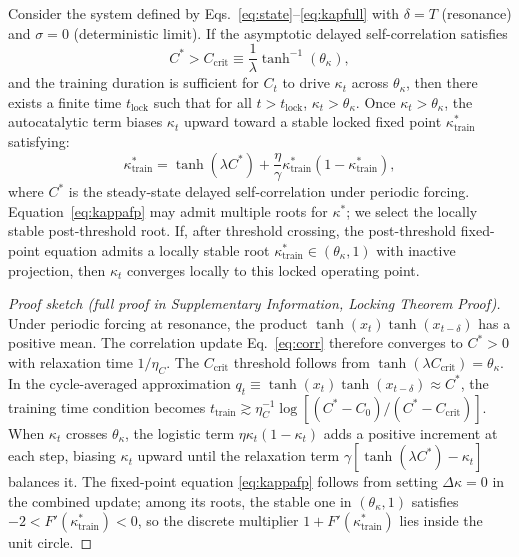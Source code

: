 \begin{theorem}[Locking]\label{thm:locking}
Consider the system defined by Eqs.~\eqref{eq:state}--\eqref{eq:kapfull} with $\delta = T$ (resonance) and $\sigma = 0$ (deterministic limit). If the asymptotic delayed self-correlation satisfies
\begin{equation}\label{eq:thm1_condition}
C^* > C_{\mathrm{crit}} \equiv \frac{1}{\lambda}\tanh^{-1}(\theta_\kappa),
\end{equation}
and the training duration is sufficient for $C_t$ to drive $\kappa_t$ across $\theta_\kappa$, then there exists a finite time $t_{\mathrm{lock}}$ such that for all $t > t_{\mathrm{lock}}$, $\kappa_t > \theta_\kappa$. Once $\kappa_t > \theta_\kappa$, the autocatalytic term biases $\kappa_t$ upward toward a stable locked fixed point $\kappa^*_{\mathrm{train}}$ satisfying:
\begin{equation}\label{eq:kappafp}
\kappa^*_{\mathrm{train}} = \tanh(\lambda C^*) + \frac{\eta}{\gamma}\kappa^*_{\mathrm{train}}(1-\kappa^*_{\mathrm{train}}),
\end{equation}
where $C^*$ is the steady-state delayed self-correlation under periodic forcing. Equation~\eqref{eq:kappafp} may admit multiple roots for $\kappa^*$; we select the locally stable post-threshold root. If, after threshold crossing, the post-threshold fixed-point equation admits a locally stable root $\kappa^*_{\mathrm{train}} \in (\theta_\kappa, 1)$ with inactive projection, then $\kappa_t$ converges locally to this locked operating point.
\end{theorem}

\begin{proof}[Proof sketch (full proof in Supplementary Information, Locking Theorem Proof)]
Under periodic forcing at resonance, the product $\tanh(x_t)\tanh(x_{t-\delta})$ has a positive mean. The correlation update Eq.~\eqref{eq:corr} therefore converges to $C^* > 0$ with relaxation time $1/\eta_C$. The $C_{\mathrm{crit}}$ threshold follows from $\tanh(\lambda C_{\mathrm{crit}}) = \theta_\kappa$. In the cycle-averaged approximation $q_t \equiv \tanh(x_t)\tanh(x_{t-\delta}) \approx C^*$, the training time condition becomes $t_{\mathrm{train}} \gtrsim \eta_C^{-1}\log[(C^* - C_0)/(C^* - C_{\mathrm{crit}})]$. When $\kappa_t$ crosses $\theta_\kappa$, the logistic term $\eta\kappa_t(1-\kappa_t)$ adds a positive increment at each step, biasing $\kappa_t$ upward until the relaxation term $\gamma[\tanh(\lambda C^*) - \kappa_t]$ balances it. The fixed-point equation \eqref{eq:kappafp} follows from setting $\Delta\kappa = 0$ in the combined update; among its roots, the stable one in $(\theta_\kappa, 1)$ satisfies $-2 < F'(\kappa^*_{\mathrm{train}}) < 0$, so the discrete multiplier $1 + F'(\kappa^*_{\mathrm{train}})$ lies inside the unit circle.
\end{proof}

